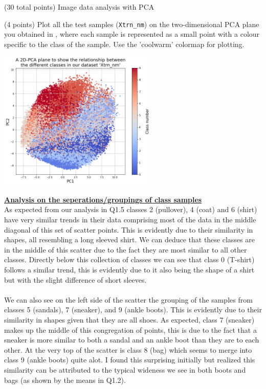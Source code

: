 \documentclass[12pt]{article}
\begin{document}
\begin{question}{(30 total points) Image data analysis with PCA}
\begin{subquestion}
   \end{subquestion}
   \begin{subquestion}{(4 points)
       Plot all the test samples (\texttt{Xtrn\_nm}) on the
       two-dimensional PCA plane you obtained in , where each sample is
       represented as a small point with a colour specific to the class of
       the sample.  Use the 'coolwarm' colormap for plotting.
     } \label{Q1.8}


   

      \begin{answerbox}{40em}
        \begin{center}
        \includegraphics[width=0.57\textwidth]{images/q18.png}
        \end{center}
        \footnotesize{\textbf{\underline{Analysis on the seperations/groupings of class samples}}}\\
        \scriptsize{
        As expected from our analysis in Q1.5 classes 2 (pullover), 4 (coat) and 6 (shirt) have very similar trends in their data comprising most of the data in the middle diagonal of this set of scatter points. This is evidently due to their similarity in shapes, all resembling a long sleeved shirt. We can deduce that these classes are in the middle of this scatter due to the fact they are most similar to all other classes. Directly below this collection of classes we can see that class 0 (T-shirt) follows a similar trend, this is evidently due to it also being the shape of a shirt but with the slight difference of short sleeves.\\
\\
        We can also see on the left side of the scatter the grouping of the samples from classes 5 (sandals), 7 (sneaker), and 9 (ankle boots). This is evidently due to their similarity in shapes given that they are all shoes. As expected, class 7 (sneaker) makes up the middle of this congregation of points, this is due to the fact that a sneaker is more similar to both a sandal and an ankle boot than they are to each other. At the very top of the scatter is class 8 (bag) which seems to merge into class 9 (ankle boots) quite alot. I found this surprising initially but realized this similarity can be attributed to the typical wideness we see in both boots and bags (as shown by the means in Q1.2).\\
}
\end{answerbox}
\end{subquestion}
\end{question}
\end{document}
